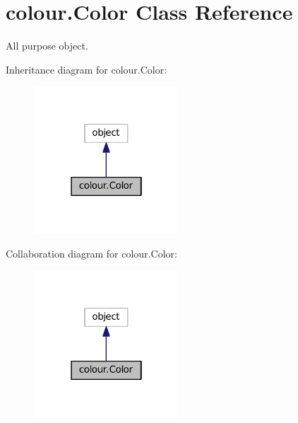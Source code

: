 \hypertarget{classcolour_1_1Color}{}\section{colour.\+Color Class Reference}
\label{classcolour_1_1Color}


All purpose object.  




Inheritance diagram for colour.\+Color\+:\nopagebreak
\begin{figure}[H]
\begin{center}
\leavevmode
\includegraphics[width=154pt]{classcolour_1_1Color__inherit__graph}
\end{center}
\end{figure}


Collaboration diagram for colour.\+Color\+:\nopagebreak
\begin{figure}[H]
\begin{center}
\leavevmode
\includegraphics[width=154pt]{classcolour_1_1Color__coll__graph}
\end{center}
\end{figure}
